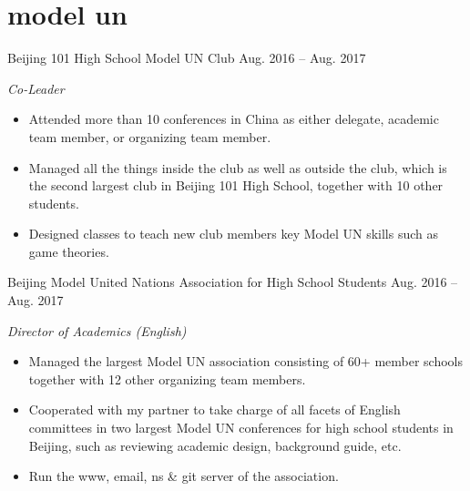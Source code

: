 \documentclass[hidelinks__VERSION__]{adamyi-cv} %
\begin{document}

\section{model un}

\begin{entrylist}


\entry
{Beijing 101 High School Model UN Club}
{Aug. 2016 -- Aug. 2017}
{\emph{Co-Leader}
\begin{itemize}
\item Attended more than 10 conferences in China as either delegate, academic team member, or organizing team member.
\item Managed all the things inside the club as well as outside the club, which is the second largest club in Beijing 101 High School, together with 10 other students.
\item Designed classes to teach new club members key Model UN skills such as game theories.
\end{itemize}}


\entry
{Beijing Model United Nations Association for High School Students}
{Aug. 2016 -- Aug. 2017}
{\emph{Director of Academics (English)}
\begin{itemize}
\item Managed the largest Model UN association consisting of 60+ member schools together with 12 other organizing team members.
\item Cooperated with my partner to take charge of all facets of English committees in two largest Model UN conferences for high school students in Beijing, such as reviewing academic design, background guide, etc.
\item Run the www, email, ns \& git server of the association.
\end{itemize}}


\end{entrylist}

\pagebreak


\end{document}
